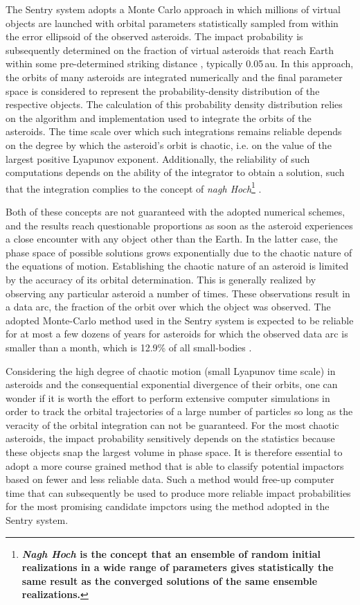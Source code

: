 \documentclass{aa}
\begin{document}
The Sentry system adopts a Monte Carlo approach in which millions of
virtual objects are launched with orbital parameters statistically
sampled from within the error ellipsoid of the observed asteroids. The
impact probability is subsequently determined on the fraction of
virtual asteroids that reach Earth within some pre-determined striking
distance \citep{milani2002}, typically 0.05\,au. In this approach, the
orbits of many asteroids are integrated numerically and the final
parameter space is considered to represent the probability-density
distribution of the respective objects. The calculation of this
probability density distribution relies on the algorithm and
implementation used to integrate the orbits of the asteroids.  The
time scale over which such integrations remains reliable depends on
the degree by which the asteroid's orbit is chaotic, i.e. on the value
of the largest positive Lyapunov exponent.
Additionally, the
reliability of such computations depends on the ability of the
integrator to obtain a solution, such that the integration complies to
the concept of {\em nagh Hoch}\footnote{\textbf{\textit{Nagh Hoch} is
    the concept that an ensemble of random initial realizations in a
    wide range of parameters gives statistically the same result as
    the converged solutions of the same ensemble realizations.}}
\citep{PORTEGIESZWART2018160}.

Both of these concepts are not guaranteed with the adopted numerical
schemes, and the results reach questionable proportions as soon as the
asteroid experiences a close encounter with any object other than the
Earth. In the latter case, the phase space of possible solutions grows
exponentially due to the chaotic nature of the equations of motion.
Establishing the chaotic nature of an asteroid is limited by the
accuracy of its orbital determination. This is generally realized by
observing any particular asteroid a number of times. These
observations result in a data arc, the fraction of the orbit over
which the object was observed.  The adopted Monte-Carlo method used in
the Sentry system is expected to be reliable for at most a few dozens
of years \citep{HorizonsManual} for asteroids for which the observed
data arc is smaller than a month, which is 12.9\% of all small-bodies
\citep{dastcom5}.

Considering the high degree of chaotic motion (small Lyapunov time
scale) in asteroids and the consequential exponential divergence of
their orbits, one can wonder if it is worth the effort to perform
extensive computer simulations in order to track the orbital
trajectories of a large number of particles so long as the veracity of
the orbital integration can not be guaranteed. For the most chaotic
asteroids, the impact probability sensitively depends on the
statistics because these objects snap the largest volume in phase
space. It is therefore essential to adopt a more course grained method
that is able to classify potential impactors based on fewer and less
reliable data.  Such a method would free-up computer time that can
subsequently be used to produce more reliable impact probabilities for
the most promising candidate impctors using the method adopted in the
Sentry system.
\end{document}

